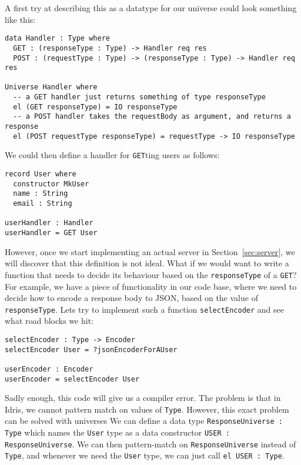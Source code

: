 \documentclass[12pt,a4paper]{article}
\begin{document}
A first try at describing this as a datatype for our universe  could look something like this:
\begin{listing}
  \begin{verbatim}
data Handler : Type where
  GET : (responseType : Type) -> Handler req res
  POST : (requestType : Type) -> (responseType : Type) -> Handler req res

Universe Handler where
  -- a GET handler just returns something of type responseType
  el (GET responseType) = IO responseType
  -- a POST handler takes the requestBody as argument, and returns a response
  el (POST requestType responseType) = requestType -> IO responseType

  \end{verbatim}
\end{listing}

We could then define a handler for \texttt{GET}ting users as follows:
\begin{verbatim}
record User where
  constructor MkUser
  name : String
  email : String

userHandler : Handler
userHandler = GET User
\end{verbatim}

However, once we start implementing an actual server in Section~\ref{sec:server}, we will discover that this definition is not ideal. What if we would want to write a function that needs to decide its behaviour based on the \texttt{responseType} of a \texttt{GET}?
For example, we have a piece of functionality in our code base, where we need to decide how to encode a response body to JSON, based on the value of \texttt{responseType}. Lets try to implement such a function \texttt{selectEncoder} and see what road blocks we hit:

\begin{verbatim}
selectEncoder : Type -> Encoder
selectEncoder User = ?jsonEncoderForAUser

userEncoder : Encoder
userEncoder = selectEncoder User
\end{verbatim}

Sadly enough, this code will give us a compiler error. The problem is that in Idris, we cannot pattern match on values of \texttt{Type}. 
However, this exact problem can be solved with universes We can define a data type \texttt{ResponseUniverse : Type} which names
the \texttt{User} type as a data constructor \texttt{USER : ResponseUniverse}. We can then pattern-match on \texttt{ResponseUniverse} instead of \texttt{Type}, and whenever we need the \texttt{User} type, we can just call \texttt{el USER : Type}.
\end{document}
